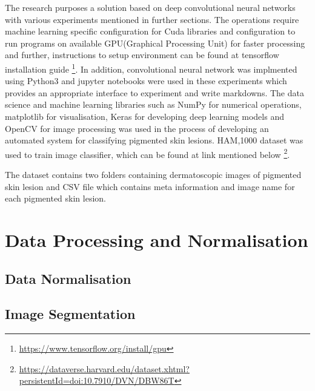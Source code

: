 The research purposes a solution based on deep convolutional neural networks with various experiments mentioned in further sections.
The operations require machine learning specific configuration for Cuda libraries and configuration to run programs on available GPU(Graphical Processing Unit) for faster processing and further, 
instructions to setup environment can be found at tensorflow installation guide \footnote[1]{\url{https://www.tensorflow.org/install/gpu}}. 
In addition, convolutional neural network was implmented using Python3 and jupyter notebooks 
were used in these experiments which provides an appropriate interface to 
experiment and write markdowns. The data science and machine learning libraries 
such as NumPy for numerical operations, matplotlib for visualisation, Keras for developing deep learning models and OpenCV for image processing was used in the process of developing an automated system for classifying pigmented skin lesions.
HAM,1000 dataset was used to train image classifier, which can be found at link mentioned below \footnote[2]{\url{https://dataverse.harvard.edu/dataset.xhtml?persistentId=doi:10.7910/DVN/DBW86T}}.

The dataset contains two folders containing dermatoscopic images of pigmented skin lesion and CSV file which contains meta information and image name for each pigmented skin lesion.

\section{Data Processing and Normalisation}

\subsection{Data Normalisation}

\subsection{ Image Segmentation }


